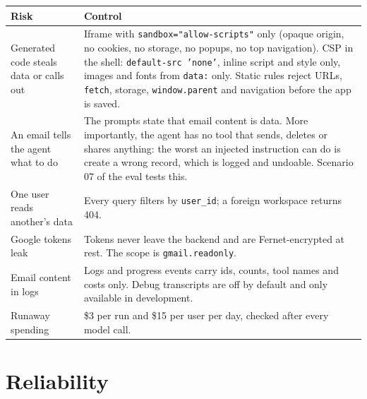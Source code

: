 \documentclass[10pt,a4paper]{article}
\newcommand{\code}[1]{\texttt{\small #1}}
\newcommand{\usd}[1]{\$#1}
\begin{document}
\begin{center}\small
\begin{tabularx}{\linewidth}{@{}P{4.2cm}L@{}}
\toprule
\textbf{Risk} & \textbf{Control} \\
\midrule
Generated code steals data or calls out & Iframe with \code{sandbox="allow-scripts"} only (opaque origin, no cookies, no storage, no popups, no top navigation). CSP in the shell: \code{default-src 'none'}, inline script and style only, images and fonts from \code{data:} only. Static rules reject URLs, \code{fetch}, storage, \code{window.parent} and navigation before the app is saved. \\
An email tells the agent what to do & The prompts state that email content is data. More importantly, the agent has no tool that sends, deletes or shares anything: the worst an injected instruction can do is create a wrong record, which is logged and undoable. Scenario 07 of the eval tests this. \\
One user reads another's data & Every query filters by \code{user\_id}; a foreign workspace returns 404. \\
Google tokens leak & Tokens never leave the backend and are Fernet-encrypted at rest. The scope is \code{gmail.readonly}. \\
Email content in logs & Logs and progress events carry ids, counts, tool names and costs only. Debug transcripts are off by default and only available in development. \\
Runaway spending & \usd{3} per run and \usd{15} per user per day, checked after every model call. \\
\bottomrule
\end{tabularx}
\end{center}

\section{Reliability}
\end{document}
